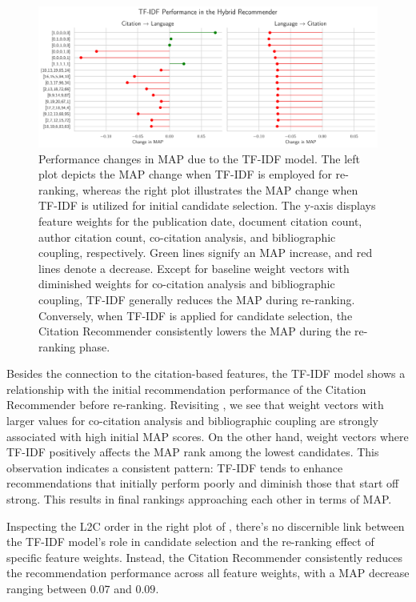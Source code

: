 \begin{figure}[htb!]
    \centering
    \includegraphics[width=\textwidth]{plots/tfidf_change_in_map.png}
    \caption[Performance of TF-IDF in the Hybrid Recommender]{Performance changes in MAP due to the TF-IDF model. The left plot depicts the MAP change when TF-IDF is employed for re-ranking, whereas the right plot illustrates the MAP change when TF-IDF is utilized for initial candidate selection. The y-axis displays feature weights for the publication date, document citation count, author citation count, co-citation analysis, and bibliographic coupling, respectively. Green lines signify an MAP increase, and red lines denote a decrease. Except for baseline weight vectors with diminished weights for co-citation analysis and bibliographic coupling, TF-IDF generally reduces the MAP during re-ranking. Conversely, when TF-IDF is applied for candidate selection, the Citation Recommender consistently lowers the MAP during the re-ranking phase.}
    \label{fig:tfidf-change-in-map}
\end{figure}

Besides the connection to the citation-based features, the TF-IDF model shows a relationship with the initial recommendation performance of the Citation Recommender before re-ranking.
Revisiting , we see that weight vectors with larger values for co-citation analysis and bibliographic coupling are strongly associated with high initial \ac{MAP} scores.
On the other hand, weight vectors where TF-IDF positively affects the \ac{MAP} rank among the lowest candidates. This observation indicates a consistent pattern: TF-IDF tends to enhance recommendations that initially perform poorly and diminish those that start off strong. This results in final rankings approaching each other in terms of \ac{MAP}.

Inspecting the \ac{L2C} order in the right plot of , there's no discernible link between the TF-IDF model's role in candidate selection and the re-ranking effect of specific feature weights. Instead, the Citation Recommender consistently reduces the recommendation performance across all feature weights, with a \ac{MAP} decrease ranging between $0.07$ and $0.09$.

